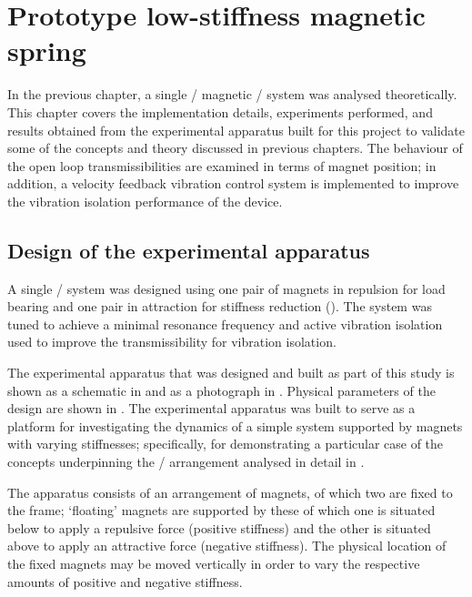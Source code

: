 \documentclass[11pt,a4paper]{memoir}
\begin{document}
\chapter{Prototype low-stiffness magnetic spring}


\noindent
In the previous chapter, a single \dof/ magnetic \qzs/ system was analysed theoretically.
This chapter covers the implementation details, experiments performed, and results obtained from the experimental apparatus built for this project to validate some of the concepts and theory discussed in previous chapters.
The behaviour of the open loop transmissibilities are examined in terms of magnet position; in addition, a velocity feedback vibration control system is implemented to improve the vibration isolation performance of the device.


\section{Design of the experimental apparatus}

A single \dof/ system was designed using one pair of magnets in repulsion for load bearing and one pair in attraction for stiffness reduction ().
The system was tuned to achieve a minimal resonance frequency and active vibration isolation used to improve the transmissibility for vibration isolation.

The experimental apparatus that was designed and built as part of this study
is shown as a schematic in  and as a photograph in
. Physical parameters of the design are shown in
. The experimental apparatus was built to serve as a platform for
investigating the dynamics of a simple system supported by magnets with
varying stiffnesses; specifically, for demonstrating a particular case of
the concepts underpinning the \qzs/ arrangement analysed in detail in .

The apparatus consists of an arrangement of magnets, of which two are
fixed to the frame; `floating' magnets are supported by these of which one
is situated below to apply a repulsive force (positive stiffness) and the
other is situated above to apply an attractive force (negative stiffness). The
physical location of the fixed magnets may be moved vertically in order to
vary the respective amounts of positive and negative stiffness.
\end{document}
